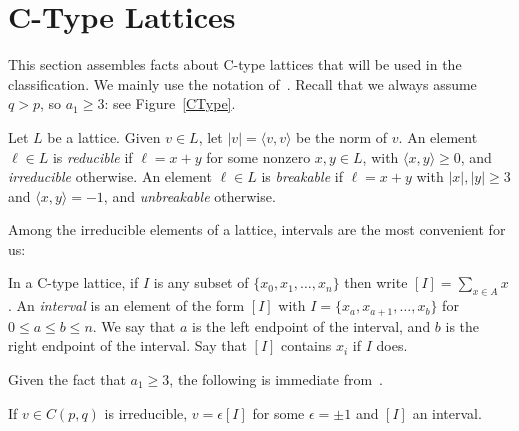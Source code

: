 \section{C-Type Lattices}\label{sec:CLattices}

This section assembles facts about C-type lattices that will be used in the classification. We mainly use the notation of~\cite{greene:LSRP, Prism2016}. Recall that we always assume $q > p$, so $a_1 \ge 3$: see Figure~\ref{CType}.

Let $L$ be a lattice. Given $v \in L$, let $|v| = \langle v, v \rangle$ be the norm of $v$. An element $\ell \in L$ is {\it reducible} if $\ell = x+y$ for some nonzero $x, y \in L$, with $\langle x, y \rangle \ge 0$, and {\it irreducible} otherwise. An element $\ell \in L$ is {\it breakable} if $\ell = x+y$ with $|x|, |y| \ge 3$ and $\langle x, y \rangle =-1$, and {\it unbreakable} otherwise.




Among the irreducible elements of a lattice, intervals are the most convenient for us:
\begin{definition}
In a C-type lattice, if $I$ is any subset of $\{x_0,x_1,\dots,x_n\}$ then write $[I] = \sum_{x \in A} x$. An {\it interval} is an element of the form $[I]$ with $I = \{x_a,x_{a+1},\dots,x_b\}$ for $0 \le a \le b \le n$. We say that $a$ is the left endpoint of the interval, and $b$ is the right endpoint of the interval. Say that $[I]$ contains $x_i$ if $I$ does. 
\end{definition}



Given the fact that $a_1 \ge 3$, the following is immediate from~\cite[Proposition~3.3]{greene:LSRP}.

\begin{prop}\label{prop:IntervalsIrreducible}
If $v \in C(p,q)$ is irreducible, $v = \epsilon[I]$ for some $\epsilon = \pm 1$ and $[I]$ an interval.
\end{prop}

